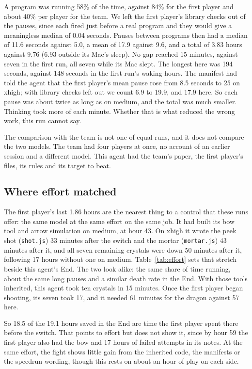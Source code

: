\documentclass[11pt,a4paper]{article}
\begin{document}
A program was running 58\% of the time, against 84\% for the first player and about 40\% per player for the team. We left the first player's library checks out of the pauses, since each fired just before a real program and they would give a meaningless median of 0.04 seconds. Pauses between programs then had a median of 11.6 seconds against 5.0, a mean of 17.9 against 9.6, and a total of 3.83 hours against 9.76 (6.93 outside its Mac's sleep). No gap reached 15 minutes, against seven in the first run, all seven while its Mac slept. The longest here was 194 seconds, against 148 seconds in the first run's waking hours. The manifest had told the agent that the first player's mean pause rose from 8.5 seconds to 25 on xhigh; with library checks left out we count 6.9 to 19.9, and 17.9 here. So each pause was about twice as long as on medium, and the total was much smaller. Thinking took more of each minute. Whether that is what reduced the wrong work, this run cannot say.

The comparison with the team is not one of equal runs, and it does not compare the two models. The team had four players at once, no account of an earlier session and a different model. This agent had the team's paper, the first player's files, its rules and its target to beat.

\subsection{Where effort matched}
\label{sec:effort}

The first player's last 1.86 hours are the nearest thing to a control that these runs offer: the same model at the same effort on the same job. It had built its bow tool and arrow simulation on medium, at hour 43. On xhigh it wrote the peek shot (\texttt{shot.js}) 33 minutes after the switch and the mortar (\texttt{mortar.js}) 43 minutes after it, and all seven remaining crystals were down 50 minutes after it, following 17 hours without one on medium. Table~\ref{tab:effort} sets that stretch beside this agent's End. The two look alike: the same share of time running, about the same long pauses and a similar death rate in the End. With those tools inherited, this agent took ten crystals in 15 minutes. Once the first player began shooting, its seven took 17, and it needed 61 minutes for the dragon against 57 here.

So 18.5 of the 19.1 hours saved in the End are time the first player spent there before the switch. That points to effort but does not show it, since by hour 59 the first player also had the bow and 17 hours of failed attempts in its notes. At the same effort, the fight shows little gain from the inherited code, the manifests or the speedrun wording, though this rests on about an hour of play on each side.
\end{document}
